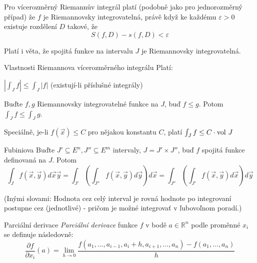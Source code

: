 \begin{veta}
Pro vícerozměrný Riemannův integrál platí (podobně jako pro jednorozměrný případ) že $f$ je Riemannovsky integrovatelná, právě když ke každému $\varepsilon > 0$ existuje rozdělení $D$ takové, že
$$S(f,D)-s(f,D)<\varepsilon$$

Platí i věta, že spojitá funkce na intervalu $J$ je Riemannovsky integrovatelná.
\end{veta}

\begin{vetaN}{Vlastnosti Riemannova vícerozměrného integrálu}
Platí:
\begin{penumerate}
	\item $|\int_J f| \le \int_J|f|$ (existují-li příslušné integrály)
	\item Buďte $f,g$ Riemannovsky integrovatelné funkce na $J$, buď $f \le g$. Potom $\int_J f \le \int_J g$.
	\item Speciálně, je-li $f(\overrightarrow{x})\le C$ pro nějakou konstantu $C$, platí $\int_J f \le C\cdot \mathrm{vol\ } J$
\end{penumerate}
\end{vetaN}

\begin{vetaN}{Fubiniova}
Buďte $J' \subseteq E^n, J'' \subseteq E^m$ intervaly, $J=J' \times J''$, buď $f$ spojitá funkce definovaná na $J$. Potom
$$\int_J f(\overrightarrow x,\overrightarrow y)d\overrightarrow x\overrightarrow y =
\int_{J'}\left(\int_{J''}f(\overrightarrow x,\overrightarrow y)d\overrightarrow y\right)d\overrightarrow x =
\int_{J''}\left(\int_{J'}f(\overrightarrow x,\overrightarrow y)d\overrightarrow x\right)d\overrightarrow y
$$

(Inými slovami: Hodnota  cez celý interval je rovná hodnote po integrovaní postupne cez (jednotlivé)  - pričom je možné integrovať v ľubovoľnom poradí.)
\end{vetaN}

\begin{definiceN}{Parciální derivace}
\emph{Parciální derivace} funkce $f$ v bodě $a\in\mathbb{R}^n$ podle proměnné $x_i$ se definuje následovně:
$$\frac{\partial f}{\partial x_i}(a)=\lim_{h\to 0}\frac{f(a_1,\dots,a_{i-1},a_i + h,a_{i+1},\dots,a_n)-f(a_1,\dots,a_n)}{h}$$
\end{definiceN}


